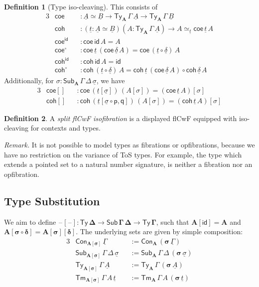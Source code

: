 \documentclass{article}
\theoremstyle{definition}
\newtheorem{definition}{Definition}
\theoremstyle{theorem}
\newcommand{\id}{\mathsf{id}}
\newcommand{\Con}{\mathsf{Con}}
\newcommand{\Sub}{\mathsf{Sub}}
\newcommand{\Tm}{\mathsf{Tm}}
\newcommand{\Ty}{\mathsf{Ty}}
\newcommand{\blank}{\mathord{\hspace{1pt}\text{--}\hspace{1pt}}}
\newcommand{\ra}{\rightarrow}
\newcommand{\p}{\mathsf{p}}
\newcommand{\q}{\mathsf{q}}
\newcommand{\bsigma}{\boldsymbol{\sigma}}
\newcommand{\bA}{\boldsymbol{A}}
\newcommand{\ul}[1]{\underline{#1}}
\newcommand{\ulGamma}{\ul{\Gamma}}
\newcommand{\uldelta}{\ul{\delta}}
\newcommand{\ulsigma}{\ul{\sigma}}
\newcommand{\ult}{\ul{t}}
\newcommand{\ulA}{\ul{A}}
\newcommand{\ulB}{\ul{B}}
\newcommand{\coe}{\mathsf{coe}}
\newcommand{\coh}{\mathsf{coh}}
\begin{document}
\begin{definition}[Type iso-cleaving] This consists of
\begin{alignat*}{3}
  & \coe &&: \ulA \simeq \ulB \ra \Ty_{\bA}\,\Gamma\,\ulA \ra \Ty_{\bA}\,\Gamma\,\ulB\\
  & \coh &&: (\ult : \ulA \simeq \ulB)(A : \Ty_{\bA}\,\Gamma\,\ulA)
           \ra A \simeq_{\ult} \coe\,\ult\,A\\
  & \coe^{\id} && : \coe\,\id\,A = A\\
  & \coe^{\circ} && : \coe\,\ult\,(\coe\,\uldelta\,A) = \coe\,(\ult\circ\uldelta)\,A\\
  & \coh^{\id} &&: \coh\,\id\,A = \id\\
  & \coh^{\circ} &&: \coh\,(\ult\circ\uldelta)\,A = \coh\,\ult\,(\coe\,\uldelta\,A)
          \circ \coh\,\uldelta\,A
\end{alignat*}
Additionally, for $\sigma : \Sub_{\bA}\,\Gamma\,\Delta\,\ulsigma$, we have
\begin{alignat*}{3}
  & \coe[] &&: \coe\,(\ult[\ulsigma])\,(A[\sigma]) = (\coe\,\ult\,A)[\sigma]\\
  & \coh[] &&: \coh\,(\ult[\ulsigma\circ \p,\q])\,(A[\sigma]) = (\coh\,\ult\,A)[\sigma]
\end{alignat*}

\end{definition}

\begin{definition} A \emph{split flCwF isofibration} is a displayed flCwF equipped with iso-cleaving for contexts and types.
\end{definition}

\emph{Remark.} It is not possible to model types as fibrations or opfibrations,
because we have no restriction on the variance of ToS types. For example, the
type which extends a pointed set to a natural number signature, is neither a
fibration nor an opfibration.

\subsection{Type Substitution}
We aim to define $\boldsymbol{\blank[\blank] : \Ty\,\Delta \ra
  \Sub\,\Gamma\,\Delta \ra \Ty\,\Gamma}$, such that $\boldsymbol{A[\id]} = \bA$
and $\boldsymbol{A[\sigma\circ\delta]} = \boldsymbol{A[\sigma][\delta]}$. The
underlying sets are given by simple composition:
\begin{alignat*}{3}
  & \Con_{\boldsymbol{A[\sigma]}}\,\ulGamma && := \Con_{\bA}\,(\bsigma\,\ulGamma)\\
  & \Sub_{\boldsymbol{A[\sigma]}}\,\Gamma\,\Delta\,\ulsigma && :=
    \Sub_{\bA}\,\Gamma\,\Delta\,(\bsigma\,\ulsigma)\\
  & \Ty_{\boldsymbol{A[\sigma]}}\,\Gamma\,\ulA && :=
      \Ty_{\bA}\,\Gamma\,(\bsigma\,\ulA)\\
  & \Tm_{\boldsymbol{A[\sigma]}}\,\Gamma\,A\,\ult && :=
      \Tm_{\bA}\,\Gamma\,A\,(\bsigma\,\ult)
\end{alignat*}
\end{document}
